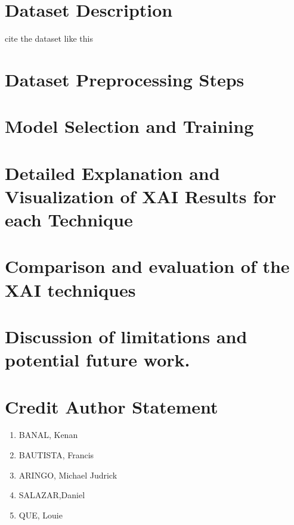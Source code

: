 \section{Dataset Description}
\label{sec:datasetDescription}
cite the dataset like this \cite{explainAI}
\IEEEpubidadjcol %
\section{Dataset Preprocessing Steps}
\label{sec:datasetPreprocess}

\section{Model Selection and Training}
\label{sec:modelSelection}

\section{Detailed Explanation and Visualization of XAI Results for each Technique}
\label{sec:explanation}

\section{Comparison and evaluation of the XAI techniques}
\label{sec:evaluation}

\section{Discussion of limitations and potential future work.}
\label{sec:discussion}

\section{Credit Author Statement}

\begin{enumerate}
    \item BANAL, Kenan
    \item BAUTISTA, Francis
    \item ARINGO, Michael Judrick
    \item SALAZAR,Daniel
    \item QUE, Louie
\end{enumerate}





 























